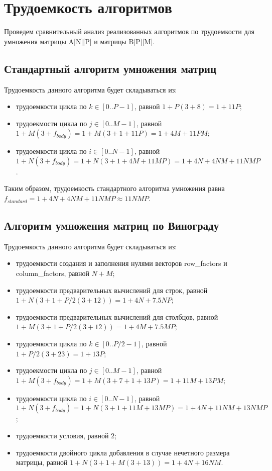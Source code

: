 \section{Трудоемкость алгоритмов}

Проведем сравнительный анализ реализованных алгоритмов по трудоемкости для умножения матрицы A[N][P] и матрицы B[P][M].

\subsection{Стандартный алгоритм умножения матриц}

Трудоемкость данного алгоритма будет складываться из:

\begin{itemize}
	\item трудоемкости цикла по $k \in [0..P-1]$, равной $1 + P(3 + 8) = 1 + 11P$;
	\item трудоекмости цикла по $j \in [0..M-1]$, равной $1 + M(3 + f_{body}) = 1 + M(3 + 1 + 11P) = 1 + 4M + 11PM$;
	\item трудоемкости цикла по $i \in [0..N-1]$, равной $1 + N(3 + f_{body}) = 1 + N(3 + 1 + 4M + 11MP) = 1 + 4N + 4NM + 11NMP$.
\end{itemize}

Таким образом, трудоемкость стандартного алгоритма умножения равна $f_{standard} = 1 + 4N + 4NM + 11NMP \approx 11NMP$.

\subsection{Алгоритм умножения матриц по Винограду}

Трудоемкость данного алгоритма будет складываться из:

\begin{itemize}
	\item трудоемкости создания и заполнения нулями векторов row\_factors и column\_factors, равной $N + M$;
	\item трудоемкости предварительных вычислений для строк, равной $1 + N(3 + 1 + P/2(3 + 12)) = 1 + 4N + 7.5NP$;
	\item трудоемкости предварительных вычислений для столбцов, равной $1 + M(3 + 1 + P/2(3 + 12)) = 1 + 4M + 7.5MP$;
	\item трудоемкости цикла по $k \in [0..P/2-1]$, равной $1 + P/2(3 + 23) = 1 + 13P$;
	\item трудоекмости цикла по $j \in [0..M-1]$, равной $1 + M(3 + f_{body}) = 1 + M(3 + 7 + 1 + 13P) = 1 + 11M + 13PM$;
	\item трудоемкости цикла по $i \in [0..N-1]$, равной $1 + N(3 + f_{body}) = 1 + N(3 + 1 + 11M + 13MP) = 1 + 4N + 11NM + 13NMP$;
	\item трудоемкости условия, равной $2$;
	\item трудоемкости двойного цикла добавления в случае нечетного размера матрицы, равной $1 + N(3 + 1 + M(3 + 13)) = 1 + 4N + 16NM$.
\end{itemize}

